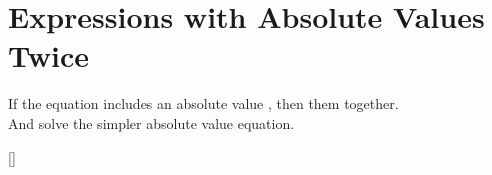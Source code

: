 \section{Expressions with Absolute Values Twice}

\begin{tcolorbox}[center,width=5.5in,]
    \raggedright
    If the equation includes an absolute value  ,
    then  them together.\\[0.5\baselineskip]
    And solve the simpler absolute value equation.
\end{tcolorbox}

[\raggedleft{}]
